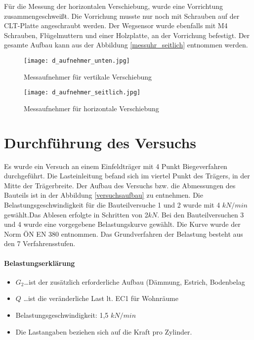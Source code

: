 \documentclass[12 pt,a4 paper ]{scrreprt}
\begin{document}
Für die Messung der horizontalen Verschiebung, wurde eine Vorrichtung zusammengeschweißt. Die Vorrichung musste nur noch mit Schrauben auf der CLT-Platte angeschraubt werden. Der Wegsensor wurde ebenfalls mit M4 Schrauben, Flügelmuttern und einer Holzplatte, an der Vorrichung befestigt. Der gesamte Aufbau kann aus der Abbildung \ref{messuhr_seitlich} entnommen werden.



\begin{figure}[h!]
\begin{minipage}[h!]{5cm}
	\texttt{[image: d\_aufnehmer\_unten.jpg]}
	\caption{Messaufnehmer für vertikale Verschiebung}
	\label{d_aufnehmer_unten}
\end{minipage}
\hfill
\begin{minipage}[h!]{5cm}
	\texttt{[image: d\_aufnehmer\_seitlich.jpg]}
	\caption{Messaufnehmer für horizontale Verschiebung}
	\label{d_aufnehmer_seitlich}
\end{minipage}
\end{figure}










	
\section{Durchführung des Versuchs}
Es wurde ein Versuch an einem Einfeldträger mit 4 Punkt Biegeverfahren durchgeführt. Die Lasteinleitung befand sich im viertel Punkt des Trägers, in der Mitte der Trägerbreite. Der Aufbau des Versuchs bzw. die Abmessungen des Bauteils ist in der Abbildung \ref{versuchsaufbau} zu entnehmen. Die Belastungsgeschwindigkeit für die Bauteilversuche 1 und 2 wurde mit 4 $kN/min$ gewählt.Das Ablesen erfolgte in Schritten von 2$kN$. Bei den Bauteilversuchen 3 und 4 wurde eine vorgegebene Belastungskurve gewählt. Die Kurve wurde der Norm ÖN EN 380 entnommen. Das Grundverfahren der Belastung besteht aus den 7 Verfahrensstufen. 

\paragraph{Belastungserklärung}
\begin{itemize}
\item $G_{2}$\ldots ist der zusätzlich erforderliche Aufbau (Dämmung, Estrich, Bodenbelag
\item $Q$ \ldots ist die veränderliche Last lt. EC1 für Wohnräume
\item Belastungsgeschwindigkeit: 1,5 $kN/min$
\item Die Lastangaben beziehen sich auf die Kraft pro Zylinder.
\end{itemize}
	
\end{document}
